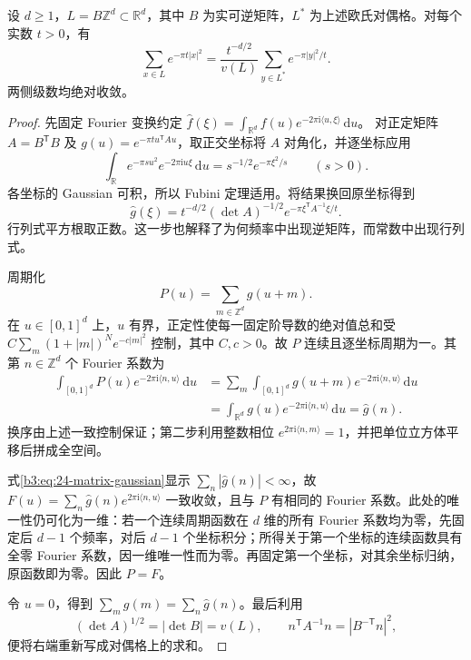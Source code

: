 \begin{lemma}\label{b3:lem:24-lattice-poisson}
设 \(d\ge1\)，\(L=B\mathbb Z^d\subset\mathbb R^d\)，其中 \(B\) 为实可逆矩阵，\(L^*\) 为上述欧氏对偶格。对每个实数 \(t>0\)，有
\[
 \sum_{x\in L}e^{-\pi t|x|^2}
 =\frac{t^{-d/2}}{v(L)}
       \sum_{y\in L^*}e^{-\pi|y|^2/t}.
\]
两侧级数均绝对收敛。
\end{lemma}
\begin{proof}
先固定 Fourier 变换约定
\(\widehat f(\xi)=\int_{\mathbb R^d}f(u)e^{-2\pi\mathrm{i}\langle u,\xi\rangle}\,\mathrm du\)。
对正定矩阵 \(A=B^{\mathsf T}B\) 及 \(g(u)=e^{-\pi t u^{\mathsf T}Au}\)，取正交坐标将 \(A\) 对角化，并逐坐标应用
\[
 \int_{\mathbb R}e^{-\pi s u^2}e^{-2\pi\mathrm{i}u\xi}\,\mathrm du
 =s^{-1/2}e^{-\pi\xi^2/s}\qquad(s>0).
\]
各坐标的 Gaussian 可积，所以 Fubini 定理适用。将结果换回原坐标得到
\begin{equation}\label{b3:eq:24-matrix-gaussian}
 \widehat g(\xi)
 =t^{-d/2}(\det A)^{-1/2}
       e^{-\pi\xi^{\mathsf T}A^{-1}\xi/t}.
\end{equation}
行列式平方根取正数。这一步也解释了为何频率中出现逆矩阵，而常数中出现行列式。

周期化
\[
 P(u)=\sum_{m\in\mathbb Z^d}g(u+m).
\]
在 \(u\in[0,1]^d\) 上，\(u\) 有界，正定性使每一固定阶导数的绝对值总和受
\(C\sum_m(1+|m|)^N e^{-c|m|^2}\) 控制，其中 \(C,c>0\)。故 \(P\) 连续且逐坐标周期为一。其第 \(n\in\mathbb Z^d\) 个 Fourier 系数为
\[
 \begin{aligned}
 \int_{[0,1]^d}P(u)e^{-2\pi\mathrm{i}\langle n,u\rangle}\,\mathrm du
 &=\sum_m\int_{[0,1]^d}g(u+m)e^{-2\pi\mathrm{i}\langle n,u\rangle}\,\mathrm du\\
 &=\int_{\mathbb R^d}g(u)e^{-2\pi\mathrm{i}\langle n,u\rangle}\,\mathrm du
 =\widehat g(n).
 \end{aligned}
\]
换序由上述一致控制保证；第二步利用整数相位
\(e^{2\pi\mathrm{i}\langle n,m\rangle}=1\)，并把单位立方体平移后拼成全空间。

式\eqref{b3:eq:24-matrix-gaussian}显示
\(\sum_n|\widehat g(n)|<\infty\)，故
\(F(u)=\sum_n\widehat g(n)e^{2\pi\mathrm{i}\langle n,u\rangle}\)
一致收敛，且与 \(P\) 有相同的 Fourier 系数。此处的唯一性仍可化为一维：若一个连续周期函数在 \(d\) 维的所有 Fourier 系数均为零，先固定后 \(d-1\) 个频率，对后 \(d-1\) 个坐标积分；所得关于第一个坐标的连续函数具有全零 Fourier 系数，因一维唯一性而为零。再固定第一个坐标，对其余坐标归纳，原函数即为零。因此 \(P=F\)。

令 \(u=0\)，得到 \(\sum_m g(m)=\sum_n\widehat g(n)\)。最后利用
\[
 (\det A)^{1/2}=|\det B|=v(L),\qquad
 n^{\mathsf T}A^{-1}n=|B^{-\mathsf T}n|^2,
\]
便将右端重新写成对偶格上的求和。
\end{proof}

